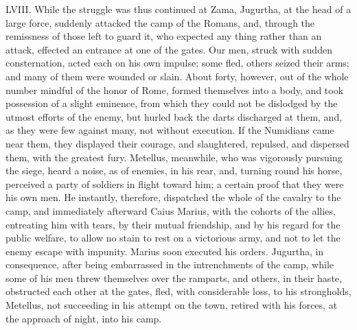 LVIII. While the struggle was thus continued at Zama, Jugurtha, at the
head of a large force, suddenly attacked the camp of the Romans, and,
through the remissness of those left to guard it, who expected any
thing rather than an attack, effected an entrance at one of the gates.
Our men, struck with sudden consternation, acted each on his own
impulse; some fled, others seized their arms; and many of them were
wounded or slain. About forty, however, out of the whole number
mindful of the honor of Rome, formed themselves into a body, and took
possession of a slight eminence, from which they could not be
dislodged by the utmost efforts of the enemy, but hurled back the
darts discharged at them, and, as they were few against many, not
without execution. If the Numidians came near them, they displayed
their courage, and slaughtered, repulsed, and dispersed them, with the
greatest fury. Metellus, meanwhile, who was vigorously pursuing the
siege, heard a noise, as of enemies, in his rear, and, turning round
his horse, perceived a party of soldiers in flight toward him; a
certain proof that they were his own men. He instantly, therefore,
dispatched the whole of the cavalry to the camp, and immediately
afterward Caius Marius, with the cohorts of the allies, entreating him
with tears, by their mutual friendship, and by his regard for the
public welfare, to allow no stain to rest on a victorious army, and
not to let the enemy escape with impunity. Marius soon executed his
orders. Jugurtha, in consequence, after being embarrassed in the
intrenchments of the camp, while some of his men threw themselves over
the ramparts, and others, in their haste, obstructed each other at the
gates, fled, with considerable loss, to his strongholds, Metellus, not
succeeding in his attempt on the town, retired with his forces, at the
approach of night, into his camp.


